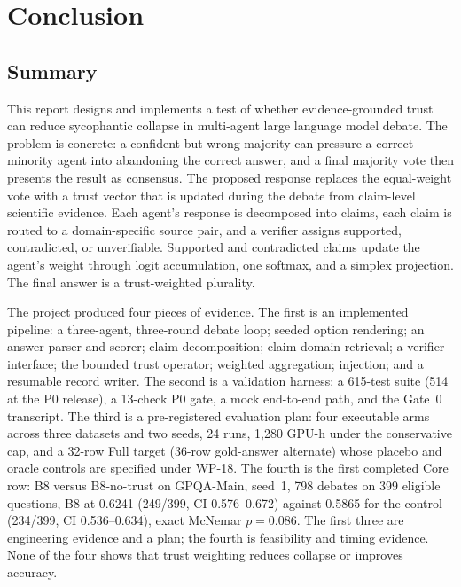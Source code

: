 \chapter{Conclusion}\label{chapter:conclusion}

\section{Summary}\label{sec:conclusion-summary}

This report designs and implements a test of whether evidence-grounded trust can reduce sycophantic collapse in multi-agent large language model debate. The problem is concrete: a confident but wrong majority can pressure a correct minority agent into abandoning the correct answer, and a final majority vote then presents the result as consensus. The proposed response replaces the equal-weight vote with a trust vector that is updated during the debate from claim-level scientific evidence. Each agent's response is decomposed into claims, each claim is routed to a domain-specific source pair, and a verifier assigns supported, contradicted, or unverifiable. Supported and contradicted claims update the agent's weight through logit accumulation, one softmax, and a simplex projection. The final answer is a trust-weighted plurality.

The project produced four pieces of evidence. The first is an implemented pipeline: a three-agent, three-round debate loop; seeded option rendering; an answer parser and scorer; claim decomposition; claim-domain retrieval; a verifier interface; the bounded trust operator; weighted aggregation; injection; and a resumable record writer. The second is a validation harness: a 615-test suite (514 at the P0 release), a 13-check P0 gate, a mock end-to-end path, and the Gate~0 transcript. The third is a pre-registered evaluation plan: four executable arms across three datasets and two seeds, 24 runs, 1,280 GPU-h under the conservative cap, and a 32-row Full target (36-row gold-answer alternate) whose placebo and oracle controls are specified under WP-18. The fourth is the first completed Core row: B8 versus B8-no-trust on GPQA-Main, seed~1, 798 debates on 399 eligible questions, B8 at 0.6241 (249/399, CI 0.576--0.672) against 0.5865 for the control (234/399, CI 0.536--0.634), exact McNemar $p=0.086$. The first three are engineering evidence and a plan; the fourth is feasibility and timing evidence. None of the four shows that trust weighting reduces collapse or improves accuracy.

